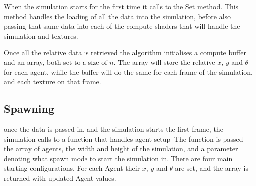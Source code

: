 \documentclass[]{report}
\begin{document}
When the simulation starts for the first time it calls to the Set method. This method handles the loading of all the data into the simulation, before also passing that same data into each of the \glspl{compute shader} that will handle the simulation and textures.

Once all the relative data is retrieved the algorithm initialises a compute buffer and an array, both set to a size of $n$. The array will store the relative $x$, $y$ and $\theta$ for each agent, while the buffer will do the same for each frame of the simulation, and each texture on that frame.

\subsection{Spawning}

once the data is passed in, and the simulation starts the first frame, the simulation calls to a  function that handles agent setup. The function is passed the array of agents, the width and height of the simulation, and a parameter denoting what spawn mode to start the simulation in. There are four main starting configurations. For each Agent their $x$, $y$ and $\theta$ are set, and the array is returned with updated Agent values.
\end{document}
